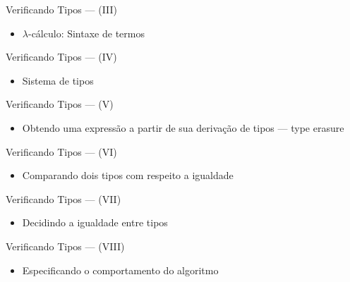 \documentclass{beamer}
\begin{document}
       \begin{frame}{Verificando Tipos --- (III)}
         \begin{itemize}
           \item $\lambda$-c\'alculo: Sintaxe de termos
         \end{itemize}
       \end{frame}

       \begin{frame}{Verificando Tipos --- (IV)}
         \begin{itemize}
           \item Sistema de tipos
         \end{itemize}
       \end{frame}
       
       \begin{frame}{Verificando Tipos --- (V)}
         \begin{itemize}
           \item Obtendo uma express\~ao a partir de sua deriva\c{c}\~ao de tipos --- type erasure
         \end{itemize}
       \end{frame}
       

       \begin{frame}{Verificando Tipos --- (VI)}
         \begin{itemize}
           \item Comparando dois tipos com respeito a igualdade
         \end{itemize}
       \end{frame}

       \begin{frame}{Verificando Tipos --- (VII)}
         \begin{itemize}
           \item Decidindo a igualdade entre tipos
         \end{itemize}
       \end{frame}

       \begin{frame}{Verificando Tipos --- (VIII)}
         \begin{itemize}
           \item Especificando o comportamento do algoritmo
         \end{itemize}
       \end{frame}
\end{document}
